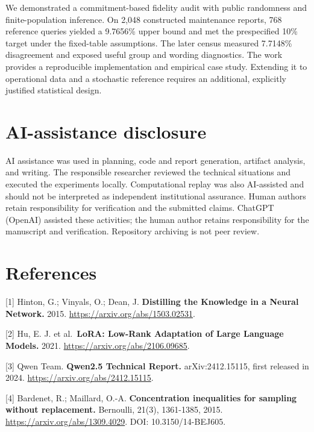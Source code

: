\documentclass[
  10pt,
]{article}
\let\oldsection\section
\renewcommand{\section}{\needspace{5\baselineskip}\oldsection}
\begin{document}
We demonstrated a commitment-based fidelity audit with public randomness
and finite-population inference. On 2,048 constructed maintenance
reports, 768 reference queries yielded a 9.7656\% upper bound and met
the prespecified 10\% target under the fixed-table assumptions. The
later census measured 7.7148\% disagreement and exposed useful group and
wording diagnostics. The work provides a reproducible implementation and
empirical case study. Extending it to operational data and a stochastic
reference requires an additional, explicitly justified statistical
design.

\hypertarget{ai-assistance-disclosure}{%
\section{AI-assistance disclosure}\label{ai-assistance-disclosure}}

AI assistance was used in planning, code and report generation, artifact
analysis, and writing. The responsible researcher reviewed the technical
situations and executed the experiments locally. Computational replay
was also AI-assisted and should not be interpreted as independent
institutional assurance. Human authors retain responsibility for
verification and the submitted claims. ChatGPT (OpenAI) assisted these
activities; the human author retains responsibility for the manuscript
and verification. Repository archiving is not peer review.

\hypertarget{references}{%
\section*{References}\label{references}}

{[}1{]} Hinton, G.; Vinyals, O.; Dean, J. \textbf{Distilling the
Knowledge in a Neural Network.} 2015.
\url{https://arxiv.org/abs/1503.02531}.

{[}2{]} Hu, E. J. et al.~\textbf{LoRA: Low-Rank Adaptation of Large
Language Models.} 2021. \url{https://arxiv.org/abs/2106.09685}.

{[}3{]} Qwen Team. \textbf{Qwen2.5 Technical Report.} arXiv:2412.15115,
first released in 2024. \url{https://arxiv.org/abs/2412.15115}.

{[}4{]} Bardenet, R.; Maillard, O.-A. \textbf{Concentration inequalities
for sampling without replacement.} Bernoulli, 21(3), 1361-1385, 2015.
\url{https://arxiv.org/abs/1309.4029}. DOI: 10.3150/14-BEJ605.
\end{document}
